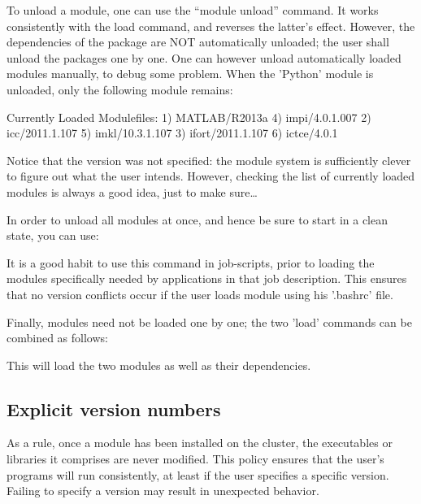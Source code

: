 To unload a module, one can use the ``module unload'' command. It works
consistently with the load command, and reverses the latter's effect. However,
the dependencies of the package are NOT automatically unloaded; the user shall
unload the packages one by one. One can however unload automatically loaded
modules manually, to debug some problem. When the 'Python' module is unloaded,
only the following module remains:

\begin{prompt}
Currently Loaded Modulefiles:
  1) MATLAB/R2013a        4) impi/4.0.1.007
  2) icc/2011.1.107       5) imkl/10.3.1.107
  3) ifort/2011.1.107     6) ictce/4.0.1
\end{prompt}

Notice that the version was not specified: the module system is sufficiently
clever to figure out what the user intends. However, checking the list of
currently loaded modules is always a good idea, just to make sure\ldots

In order to unload all modules at once, and hence be sure to start in a clean
state, you can use:

\begin{prompt}
\end{prompt}

It is a good habit to use this command in job-scripts, prior to loading the
modules specifically needed by applications in that job description. This
ensures that no version conflicts occur if the user loads module using his
'.bashrc' file.

Finally, modules need not be loaded one by one; the two 'load' commands can be
combined as follows:

\begin{prompt}
\end{prompt}

This will load the two modules as well as their dependencies.

\subsection{Explicit version numbers}

As a rule, once a module has been installed on the cluster, the executables or
libraries it comprises are never modified. This policy ensures that the user's
programs will run consistently, at least if the user specifies a specific
version. Failing to specify a version may result in unexpected behavior.

